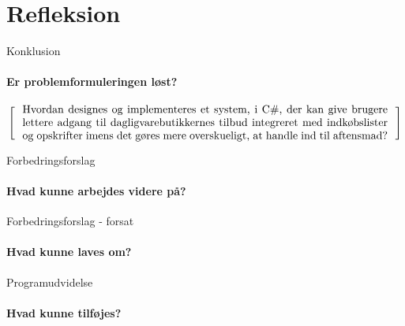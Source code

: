 \section{Refleksion}
\begin{frame}{Konklusion}
	\framesubtitle{Er problemformuleringen løst?}
	\[
  \left[
  \begin{minipage}{\textwidth}
  \centering
  \begin{minipage}{0.96\textwidth}
  Hvordan designes og implementeres et system, i C\#, der kan give brugere lettere adgang til dagligvarebutikkernes tilbud integreret med indkøbslister og opskrifter imens det gøres mere overskueligt, at handle ind til aftensmad?
  \end{minipage} 
  \end{minipage}                           
    \right]
\]
\end{frame}
\begin{frame}{Forbedringsforslag}
	\framesubtitle{Hvad kunne arbejdes videre på?}
\end{frame}
\begin{frame}{Forbedringsforslag - forsat}
	\framesubtitle{Hvad kunne laves om?}
\end{frame}
\begin{frame}{Programudvidelse}
	\framesubtitle{Hvad kunne tilføjes?}
\end{frame}